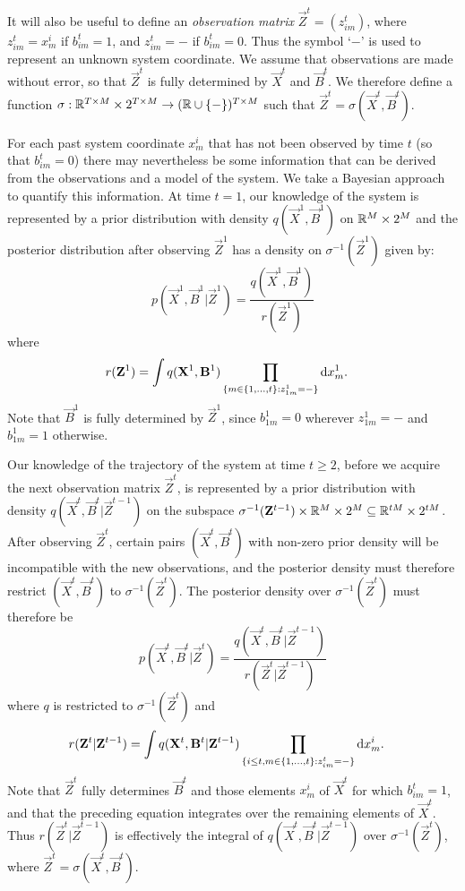 It will also be useful to define an {\em observation matrix} $\vec{Z}^t = (z^t_{im})$, where $z^t_{im} = x^i_m$ if $b^t_{im} = 1$, and $z^t_{im} = -$ if $b^t_{im} = 0$. Thus the symbol `$-$' is used to represent an unknown system coordinate. We assume that observations are made without error, so that $\vec{Z}^t$ is fully determined by $\vec{X}^t$ and $\vec{B}^t$. We therefore define a function $\sigma: \mathbb R^{T \times M} \times 2^{T \times M} \rightarrow (\mathbb R \cup \{ - \})^{T \times M}$ such that $\vec{Z}^t = \sigma(\vec{X}^t, \vec{B}^t)$.

For each past system coordinate $x^i_m$ that has not been observed by time $t$ (so that $b^t_{im} = 0$) there may nevertheless be some information that can be derived from the observations and a model of the system. We take a Bayesian approach to quantify this information. At time $t=1$, our knowledge of the system is represented by a prior distribution with density $q(\vec{X}^1, \vec{B}^1)$ on $\mathbb R^M \times 2^M$ and the posterior distribution after observing $\vec{Z}^1$ has a density on $\sigma^{-1}(\vec{Z}^1)$ given by:
\begin{equation*}
    p(\vec{X}^1, \vec{B}^1 |\vec{Z}^1) =
        \frac{q(\vec{X}^1, \vec{B}^1)}
        {r(\vec{Z}^1)} 
\end{equation*}
where
\begin{align*}
    r(\mathbf{Z}^1)  &= \int q(\mathbf{X}^1, \mathbf{B}^1) \prod_{ \{m \in \{1, \ldots, t \} : z^1_{1m} = - \} } \mathrm{d} x^1_m.
\end{align*}
Note that $\vec{B}^1$ is fully determined by $\vec{Z}^1$, since $b^1_{1m} = 0$ wherever $z^1_{1m} = -$ and $b^1_{1m} = 1$ otherwise.

Our knowledge of the trajectory of the system at time $t \geq 2$, before we acquire the next observation matrix $\vec{Z}^t$, is represented by a prior distribution with density $q(\vec{X}^t, \vec{B}^t | \vec{Z}^{t-1})$ on the subspace $\sigma^{-1}(\mathbf{Z}^{t-1}) \times \mathbb R^M \times 2^M \subseteq \mathbb R^{tM} \times 2^{tM}$. After observing $\vec{Z}^t$, certain pairs $(\vec{X}^t, \vec{B}^t)$ with non-zero prior density will be incompatible with the new observations, and the posterior density must therefore restrict $(\vec{X}^t, \vec{B}^t)$ to $\sigma^{-1}(\vec{Z}^t)$. The posterior density over $\sigma^{-1}(\vec{Z}^t)$ must therefore be
\begin{equation*}
    p(\vec{X}^t, \vec{B}^t |\vec{Z}^t) =
        \frac{q(\vec{X}^t, \vec{B}^t | \vec{Z}^{t-1})}
        {r(\vec{Z}^t | \vec{Z}^{t-1})} 
\end{equation*}
where $q$ is restricted to $\sigma^{-1}(\vec{Z}^t)$ and
\begin{align*}
    r(\mathbf{Z}^t | \mathbf{Z}^{t-1})  &= \int q(\mathbf{X}^t, \mathbf{B}^t | \mathbf{Z}^{t-1}) \prod_{ \{ i \leq t, m \in \{1, \ldots, t \} : z^t_{im} = - \} } \mathrm{d} x^i_m.
\end{align*}
Note that $\vec{Z}^t$ fully determines $\vec{B}^t$ and those elements $x_m^i$ of $\vec{X}^t$ for which $b_{im}^t = 1$, and that the preceding equation integrates over the remaining elements of $\vec{X}^t$. Thus $r(\vec{Z}^t | \vec{Z}^{t-1})$ is effectively the integral of $q(\vec{X}^t, \vec{B}^t | \vec{Z}^{t-1})$ over $\sigma^{-1}(\vec{Z}^t)$, where $\vec{Z}^{t} = \sigma(\vec{X}^t, \vec{B}^t)$.

